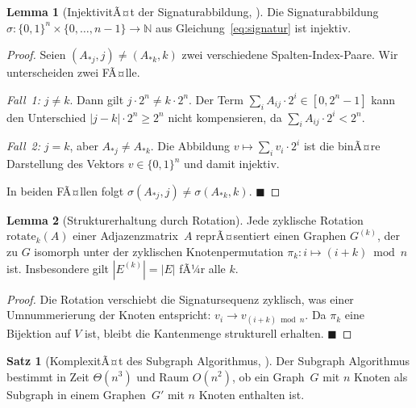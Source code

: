 ﻿\documentclass[a4paper,12pt]{article}
\theoremstyle{definition}
\newtheorem{satz}{Satz}[section]
\newtheorem{lemma}{Lemma}[section]
\begin{document}
\begin{lemma}[InjektivitÃ¤t der Signaturabbildung, \citealt{Epp2026}]
  \label{lem:injektivitaet}
  Die Signaturabbildung $\sigma: \{0,1\}^n \times \{0,\ldots,n-1\}
  \to \mathbb{N}$ aus Gleichung~\eqref{eq:signatur} ist injektiv.
\end{lemma}

\begin{proof}
  Seien $(A_{*j}, j) \neq (A_{*k}, k)$ zwei verschiedene
  Spalten-Index-Paare. Wir unterscheiden zwei FÃ¤lle.

  \emph{Fall~1:} $j \neq k$. Dann gilt $j \cdot 2^n \neq k \cdot 2^n$.
  Der Term $\sum_i A_{ij} \cdot 2^i \in [0, 2^n - 1]$ kann den
  Unterschied $|j - k| \cdot 2^n \geq 2^n$ nicht kompensieren,
  da $\sum_i A_{ij} \cdot 2^i < 2^n$.

  \emph{Fall~2:} $j = k$, aber $A_{*j} \neq A_{*k}$.
  Die Abbildung $v \mapsto \sum_i v_i \cdot 2^i$ ist die binÃ¤re
  Darstellung des Vektors $v \in \{0,1\}^n$ und damit injektiv.

  In beiden FÃ¤llen folgt $\sigma(A_{*j}, j) \neq \sigma(A_{*k}, k)$.
  \hfill$\blacksquare$
\end{proof}

\begin{lemma}[Strukturerhaltung durch Rotation]
  \label{lem:rot_strukturerhaltung}
  Jede zyklische Rotation $\mathrm{rotate}_k(A)$ einer
  Adjazenzmatrix~$A$ reprÃ¤sentiert einen Graphen $G^{(k)}$, der
  zu $G$ isomorph unter der zyklischen Knotenpermutation
  $\pi_k: i \mapsto (i+k) \bmod n$ ist.
  Insbesondere gilt $|E^{(k)}| = |E|$ fÃ¼r alle $k$.
\end{lemma}

\begin{proof}
  Die Rotation verschiebt die Signatursequenz zyklisch, was einer
  Umnummerierung der Knoten entspricht: $v_i \to v_{(i+k) \bmod n}$.
  Da $\pi_k$ eine Bijektion auf $V$ ist, bleibt die Kantenmenge
  strukturell erhalten. \hfill$\blacksquare$
\end{proof}

\begin{satz}[KomplexitÃ¤t des Subgraph Algorithmus, \citealt{Epp2026}]
  \label{satz:komplexitaet}
  Der Subgraph Algorithmus bestimmt in Zeit $\Theta(n^3)$ und Raum
  $O(n^2)$, ob ein Graph~$G$ mit $n$ Knoten als Subgraph in einem
  Graphen~$G'$ mit $n$ Knoten enthalten ist.
\end{satz}
\end{document}
